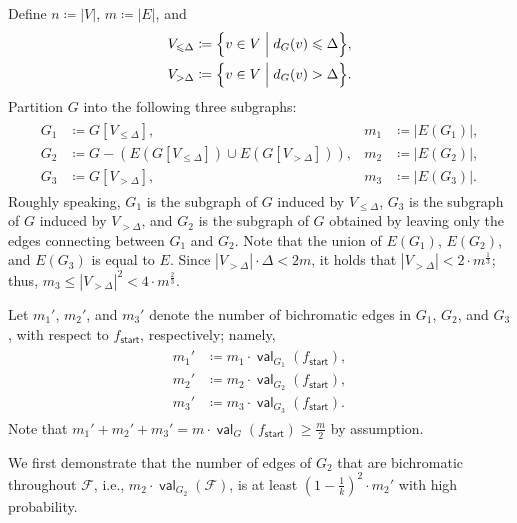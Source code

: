 \documentclass[11pt,fleqn]{article}
\renewcommand{\geq}{\geqslant}
\renewcommand{\leq}{\leqslant}
\newcommand{\defeq}{\coloneq}
\DeclareMathOperator{\val}{\mathsf{val}}
\newcommand{\sss}{\mathsf{start}}
\newcommand{\f}{f}
\newcommand{\sqcol}{\scrF}
\newcommand{\Vl}{V_{\leq \Delta}}
\newcommand{\Vg}{V_{> \Delta}}
\newcommand{\scrF}{\mathscr{F}}
\theoremstyle{definition}
\numberwithin{equation}{section}
\begin{document}
Define
$n \defeq |V|$,
$m \defeq |E|$, and
\begin{align}
\label{eq:Cut-alg:Vl-Vg}
\begin{aligned}
    \Vl \defeq \Bigl\{ v \in V \Bigm| d_G(v) \leq \Delta \Bigr\}, \\
    \Vg \defeq \Bigl\{ v \in V \Bigm| d_G(v) > \Delta \Bigr\}.
\end{aligned}
\end{align}
Partition $G$ into the following three subgraphs:
\begin{align}
\begin{aligned}
    G_1 & \defeq G[\Vl],
        & m_1 & \defeq |E(G_1)|, \\
    G_2 & \defeq G - (E(G[\Vl]) \cup E(G[\Vg])),
        & m_2 & \defeq |E(G_2)|, \\
    G_3 & \defeq G[\Vg],
        & m_3 & \defeq |E(G_3)|.
\end{aligned}
\end{align}
Roughly speaking,
$G_1$ is the subgraph of $G$ induced by $\Vl$,
$G_3$ is the subgraph of $G$ induced by $\Vg$, and
$G_2$ is the subgraph of $G$ obtained by leaving only the edges connecting between $G_1$ and $G_2$.
Note that the union of $E(G_1)$, $E(G_2)$, and $E(G_3)$ is equal to $E$.
Since $|\Vg| \cdot \Delta < 2m$,
it holds that $|\Vg| < 2\cdot m^{\frac{1}{3}}$; thus,
$m_3 \leq |\Vg|^2 < 4 \cdot m^{\frac{2}{3}}$.

Let $m_1'$, $m_2'$, and $m_3'$ denote 
the number of bichromatic edges in $G_1$, $G_2$, and $G_3$,
with respect to $\f_\sss$, respectively; namely,
\begin{align}
\begin{aligned}
    m_1' & \defeq m_1 \cdot \val_{G_1}(\f_\sss), \\
    m_2' & \defeq m_2 \cdot \val_{G_2}(\f_\sss), \\
    m_3' & \defeq m_3 \cdot \val_{G_3}(\f_\sss).
\end{aligned}
\end{align}
Note that $m_1'+m_2'+m_3' = m \cdot \val_G(\f_\sss) \geq \frac{m}{2}$ by assumption.

We first demonstrate that
the number of edges of $G_2$ that are bichromatic throughout $\sqcol$,
i.e., $m_2 \cdot \val_{G_2}(\sqcol)$,
is at least $\left(1-\frac{1}{k}\right)^2 \cdot m_2'$
with high probability.
\end{document}
